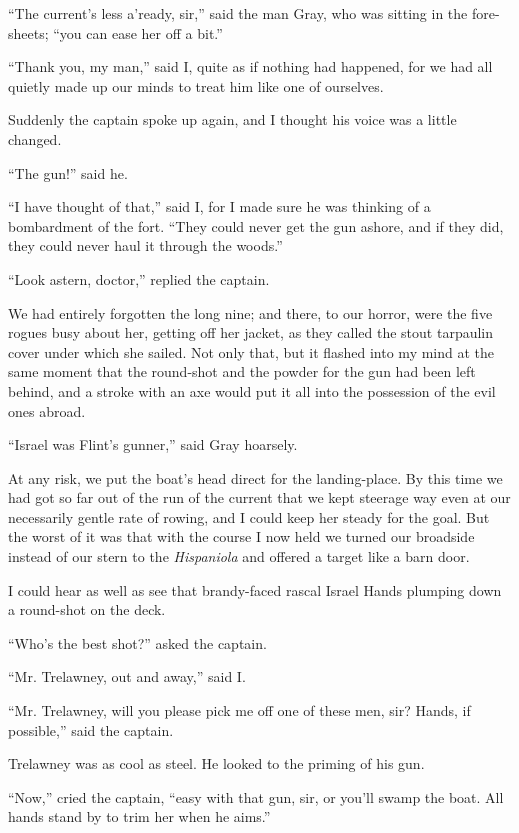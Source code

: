 \enquote{The current’s less a’ready, sir,} said the man Gray, who was sitting in the fore-sheets; \enquote{you can ease her off a bit.}

\enquote{Thank you, my man,} said I, quite as if nothing had happened, for we had all quietly made up our minds to treat him like one of ourselves.

Suddenly the captain spoke up again, and I thought his voice was a little changed.

\enquote{The gun!} said he.

\enquote{I have thought of that,} said I, for I made sure he was thinking of a bombardment of the fort. \enquote{They could never get the gun ashore, and if they did, they could never haul it through the woods.}

\enquote{Look astern, doctor,} replied the captain.

We had entirely forgotten the long nine; and there, to our horror, were the five rogues busy about her, getting off her jacket, as they called the stout tarpaulin cover under which she sailed. Not only that, but it flashed into my mind at the same moment that the round-shot and the powder for the gun had been left behind, and a stroke with an axe would put it all into the possession of the evil ones abroad.

\enquote{Israel was Flint’s gunner,} said Gray hoarsely.

At any risk, we put the boat’s head direct for the landing-place. By this time we had got so far out of the run of the current that we kept steerage way even at our necessarily gentle rate of rowing, and I could keep her steady for the goal. But the worst of it was that with the course I now held we turned our broadside instead of our stern to the \textit{Hispaniola} and offered a target like a barn door.

I could hear as well as see that brandy-faced rascal Israel Hands plumping down a round-shot on the deck.

\enquote{Who’s the best shot?} asked the captain.

\enquote{Mr. Trelawney, out and away,} said I.

\enquote{Mr. Trelawney, will you please pick me off one of these men, sir? Hands, if possible,} said the captain.

Trelawney was as cool as steel. He looked to the priming of his gun.

\enquote{Now,} cried the captain, \enquote{easy with that gun, sir, or you’ll swamp the boat. All hands stand by to trim her when he aims.}

